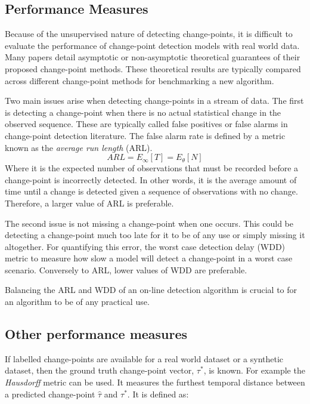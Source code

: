 \subsection{Performance Measures}
Because of the unsupervised nature of detecting change-points, it is difficult to evaluate the performance of change-point detection models with real world data. Many papers detail asymptotic or non-asymptotic theoretical guarantees of their proposed change-point methods.  These theoretical results are typically compared across different change-point methods for benchmarking a new algorithm.

Two main issues arise when detecting change-points in a stream of data. The first is detecting a change-point when there is no actual statistical change in the observed sequence. These are typically called false positives or false alarms in change-point detection literature. The false alarm rate is defined by a metric known as the \textit{average run length} (ARL). 
\begin{equation}
ARL= E_{\infty}[T] = E_{\theta}[N]
\end{equation}
Where it is the expected number of observations that must be recorded before a change-point is incorrectly detected. In other words, it is the average amount of time until a change is detected given a sequence of observations with no change. Therefore, a larger value of ARL is preferable. 

The second issue is not missing a change-point when one occurs. This could be detecting a change-point much too late for it to be of any use or simply missing it altogether. For quantifying this error, the worst case detection delay (WDD) metric to measure how slow a model will detect a  change-point in a worst case scenario. Conversely to ARL, lower values of WDD are preferable.

Balancing the ARL and WDD of an on-line detection algorithm is crucial to for an algorithm to be of any practical use. 


\subsection{Other performance measures}

If labelled change-points are available for a real world dataset or a synthetic dataset, then the ground truth change-point vector, $\tau^*$, is known. For example the \textit{Hausdorff} metric can be used. It measures the furthest temporal distance between a predicted change-point $\hat{\tau}$ and $\tau^*$. It is defined as:


